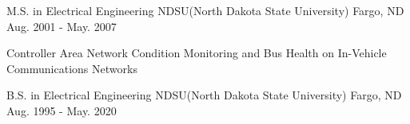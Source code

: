 

\begin{cventries}

  \cventry
    {M.S. in Electrical Engineering} %
    {NDSU(North Dakota State University)} %
    {Fargo, ND} %
    {Aug. 2001 - May. 2007} %
    {
      \begin{cvitems} %
        \item {Controller Area Network Condition Monitoring and Bus Health on In-Vehicle Communications Networks}
      \end{cvitems}
    }

  \cventry
    {B.S. in Electrical Engineering} %
    {NDSU(North Dakota State University)} %
    {Fargo, ND} %
    {Aug. 1995 - May. 2020} %
    {
      \begin{cvitems} %
      \end{cvitems}
    }


\end{cventries}
